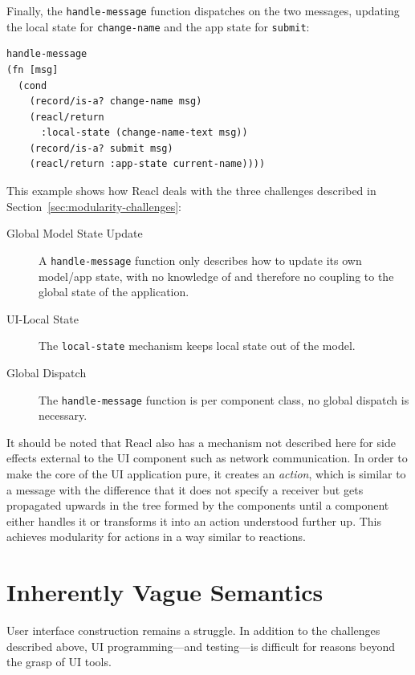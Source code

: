 \documentclass[sigplan,screen]{acmart}
\begin{document}
Finally, the \texttt{handle-message} function dispatches on the two
messages, updating the local state for \texttt{change-name} and the
app state for \texttt{submit}:
%
\begin{verbatim}
handle-message
(fn [msg]
  (cond
    (record/is-a? change-name msg)
    (reacl/return
      :local-state (change-name-text msg))
    (record/is-a? submit msg)
    (reacl/return :app-state current-name))))
\end{verbatim}
%
This example shows how Reacl deals with the three challenges described
in Section~\ref{sec:modularity-challenges}:
%
\begin{description}
\item[Global Model State Update] A \texttt{handle-message} function
  only describes how to update its own model/app state, with no
  knowledge of and therefore no coupling to the global state of the
  application.
\item[UI-Local State] The \texttt{local-state} mechanism keeps local
  state out of the model.
\item[Global Dispatch] The \texttt{handle-message} function is per
  component class, no global dispatch is necessary.
\end{description}
%
It should be noted that Reacl also has a mechanism not described here
for side effects external to the UI component 
such as network
communication.  In order to make the core of the UI application pure,
it creates an \textit{action}, which is similar to a message with the
difference that it does not specify a receiver but gets propagated
upwards in the tree formed by the components until a component either
handles it or transforms it into an action understood further up.
This achieves modularity for actions in a way similar to reactions.

\section{Inherently Vague Semantics}
\label{sec:vague-semantics}

User interface construction remains a struggle. In addition to
the challenges described above, UI programming---and testing---is
difficult for reasons beyond the grasp of UI
tools.
\end{document}

